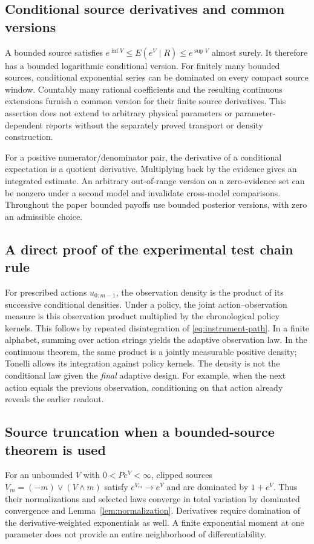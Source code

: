 \subsection{Conditional source derivatives and common versions}
A bounded source satisfies
$e^{\inf V}\le E(e^V\mid R)\le e^{\sup V}$ almost surely. It therefore has a bounded logarithmic conditional version. For finitely many bounded sources, conditional exponential series can be dominated on every compact source window. Countably many rational coefficients and the resulting continuous extensions furnish a common version for their finite source derivatives. This assertion does not extend to arbitrary physical parameters or parameter-dependent reports without the separately proved transport or density construction.

For a positive numerator/denominator pair, the derivative of a conditional expectation is a quotient derivative. Multiplying back by the evidence gives an integrated estimate. An arbitrary out-of-range version on a zero-evidence set can be nonzero under a second model and invalidate cross-model comparisons. Throughout the paper bounded payoffs use bounded posterior versions, with zero an admissible choice.

\subsection{A direct proof of the experimental test chain rule}
For prescribed actions $u_{0:m-1}$, the observation density is the product of its successive conditional densities. Under a policy, the joint action--observation measure is this observation product multiplied by the chronological policy kernels. This follows by repeated disintegration of \eqref{eq:instrument-path}. In a finite alphabet, summing over action strings yields the adaptive observation law. In the continuous theorem, the same product is a jointly measurable positive density; Tonelli allows its integration against policy kernels. The density is not the conditional law given the \emph{final} adaptive design. For example, when the next action equals the previous observation, conditioning on that action already reveals the earlier readout.

\subsection{Source truncation when a bounded-source theorem is used}
For an unbounded $V$ with $0<Pe^V<\infty$, clipped sources $V_m=(-m)\vee(V\wedge m)$ satisfy $e^{V_m}\to e^V$ and are dominated by $1+e^V$. Thus their normalizations and selected laws converge in total variation by dominated convergence and Lemma~\ref{lem:normalization}. Derivatives require domination of the derivative-weighted exponentials as well. A finite exponential moment at one parameter does not provide an entire neighborhood of differentiability.
\par
